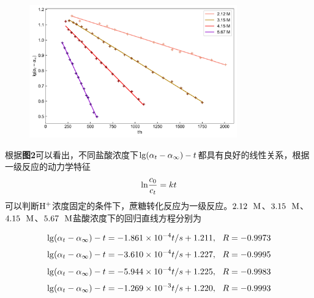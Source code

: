 \documentclass[12pt]{article}
\begin{document}
\begin{figure}[h]
	\centering
	\includegraphics[width=0.8\textwidth]{2.jpg}
\end{figure}
\par
根据\textbf{图2}可以看出，不同盐酸浓度下${\rm lg}(\alpha_{t}-\alpha_{\infty})-t$都具有良好的线性关系，根据一级反应的动力学特征
$$
{\rm ln}\frac{c_{0}}{c_{t}}=kt
$$
可以判断$\rm H^{+}$浓度固定的条件下，蔗糖转化反应为一级反应。$2.12\ \ {\rm M}$、$3.15\ \ {\rm M}$、$4.15\ \ {\rm M}$、$5.67\ \ {\rm M}$盐酸浓度下的回归直线方程分别为

$$
{\rm lg}(\alpha_{t}-\alpha_{\infty})-t=-1.861\times10^{-4}t/s+1.211,\ \ R=-0.9973
$$
$$
{\rm lg}(\alpha_{t}-\alpha_{\infty})-t=-3.610\times10^{-4}t/s+1.227,\ \ R=-0.9995
$$
$$
{\rm lg}(\alpha_{t}-\alpha_{\infty})-t=-5.944\times10^{-4}t/s+1.225,\ \ R=-0.9983
$$
$$
{\rm lg}(\alpha_{t}-\alpha_{\infty})-t=-1.269\times10^{-3}t/s+1.220,\ \ R=-0.9993
$$
\end{document}
